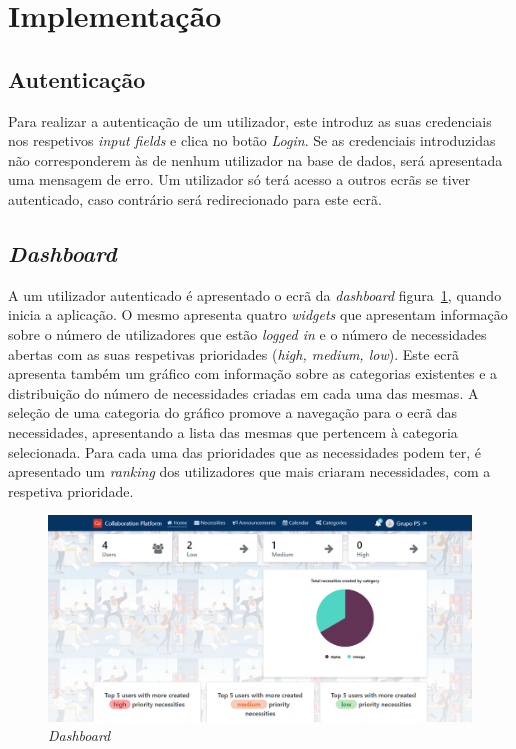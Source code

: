 \section{Implementação}\label{sec:implementacao}

\subsection{Autenticação}\label{subsec:implementacao:login}

Para realizar a autenticação de um utilizador, este introduz as suas credenciais nos respetivos \textit{input fields} e clica no botão \textit{Login}.
Se as credenciais introduzidas não corresponderem às de nenhum utilizador na base de dados, será apresentada uma mensagem de erro.
Um utilizador só terá acesso a outros ecrãs se tiver autenticado, caso contrário será redirecionado para este ecrã.

\subsection{\textit{Dashboard}}\label{subsec:implementacao:dashboard}

A um utilizador autenticado é apresentado o ecrã da \textit{dashboard} figura~\ref{fig:Dashboard}, quando inicia a aplicação.
O mesmo apresenta quatro \textit{widgets} que apresentam informação sobre o número de utilizadores que estão \textit{logged in} e o número de necessidades abertas com as suas respetivas prioridades (\textit{high, medium, low}).
Este ecrã apresenta também um gráfico com informação sobre as categorias existentes e a distribuição do número de necessidades criadas em cada uma das mesmas.
A seleção de uma categoria do gráfico promove a navegação para o ecrã das necessidades,  apresentando a lista das mesmas que pertencem à categoria selecionada.
Para cada uma das prioridades que as necessidades podem ter, é apresentado um \textit{ranking} dos utilizadores que mais criaram necessidades, com a respetiva prioridade.

\begin{figure}[H]
  \centering 
  \includegraphics[scale=0.4]{figures/Dashboard.png}
  \caption{\textit{Dashboard}}\label{fig:Dashboard}
\end{figure}


